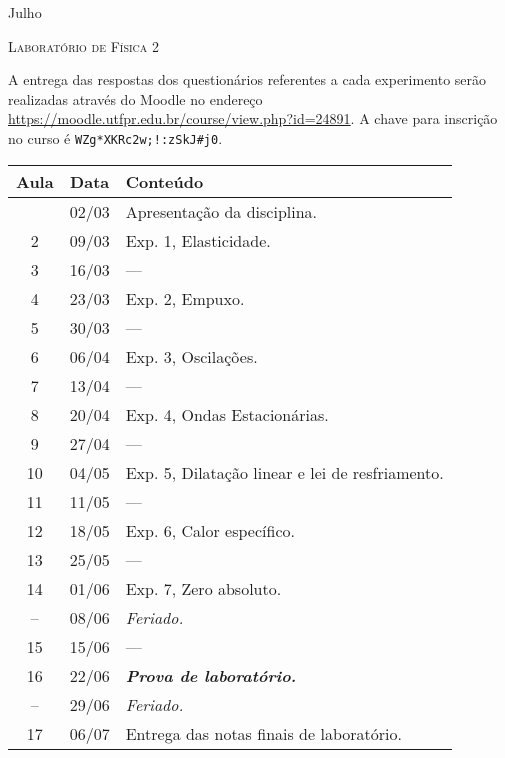 %
\begin{marginfigure}
    \centering
    Julho\\
\end{marginfigure}
\vspace{1cm}
\begin{center}
\Large\textsc{Laboratório de Física 2}
\end{center}

A entrega das respostas dos questionários referentes a cada experimento serão realizadas através do Moodle no endereço \url{https://moodle.utfpr.edu.br/course/view.php?id=24891}. A chave para inscrição no curso é \verb|WZg*XKRc2w;!:zSkJ#j0|.
\begin{center}
\begin{longtable}{ccp{70mm}}
\toprule
Aula & Data & Conteúdo \\
\midrule
\endhead
\bottomrule
\endfoot
 1 & 02/03 & Apresentação da disciplina. \\
 2 & 09/03 & Exp. 1, Elasticidade. \\
 3 & 16/03 & --- \\
 4 & 23/03 & Exp. 2, Empuxo. \\ 
 5 & 30/03 & --- \\
 6 & 06/04 & Exp. 3, Oscilações. \\
 7 & 13/04 & --- \\
 8 & 20/04 & Exp. 4, Ondas Estacionárias. \\
 9 & 27/04 & --- \\
10 & 04/05 & Exp. 5, Dilatação linear e lei de resfriamento. \\
11 & 11/05 & --- \\
12 & 18/05 & Exp. 6, Calor específico. \\
13 & 25/05 & --- \\
14 & 01/06 & Exp. 7, Zero absoluto. \\
-- & 08/06 & \emph{Feriado.} \\
15 & 15/06 & --- \\
16 & 22/06 & \textbf{\textit{Prova de laboratório.}} \\
-- & 29/06 & \emph{Feriado.} \\
17 & 06/07 & Entrega das notas finais de laboratório. \\
\end{longtable}
\end{center}

\cleardoublepage
